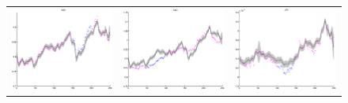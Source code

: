 \begin{figure}
\centering
\begin{tabular}{ccc}
\includegraphics[scale=0.3]{figures/fxAUD.eps} &
\includegraphics[scale=0.3]{figures/fxCAD.eps} &
\includegraphics[scale=0.3]{figures/fxJPY.eps}

\end{tabular}
\end{figure}
